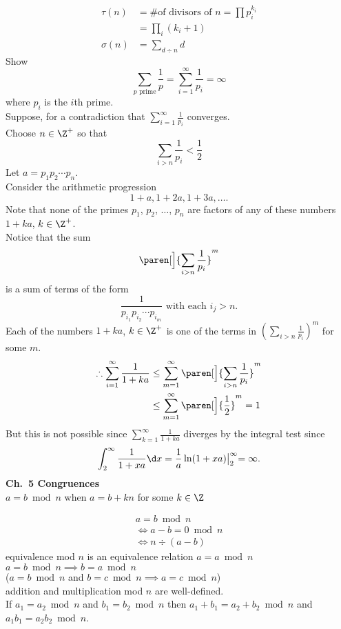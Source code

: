 \vspace{-\baselineskip}
\begin{align*}
\tau(n) &= \text{\# of divisors of $n=\prod p_i^{k_i}$} \\
&= \prod_i(k_i+1) \\
\sigma(n) &= \sum_{d\div n}d
\end{align*}
\eg Show
\[ \sum_{\text{$p$ prime}}\frac{1}{p} = \sum_{i=1}^\infty \frac{1}{p_i} = \infty \]
where $p_i$ is the $i$th prime. \\
\soln Suppose, for a contradiction that $\sum_{i=1}^\infty\frac1{p_i}$ converges. \\
Choose $n\in\Z^+$ so that
\[ \sum_{i>n}\frac1{p_i} < \frac12 \]
Let $a=p_1p_2\dotsm p_n$. \\
Consider the arithmetic progression
\[ 1+a, 1+2a, 1+3a, \dotsc . \]
Note that none of the primes $p_1$, $p_2$, $\dotsc$, $p_n$ are factors of any of these numbers $1+ka$, $k\in\Z^+$. \\
Notice that the sum
\[ \paren[\Big]{\sum_{i>n}\frac{1}{p_i}}^m \]
is a sum of terms of the form
\[ \frac{1}{p_{i_1}p_{i_2}\dotsm p_{i_m}} \text{ with each $i_j>n$} . \]
Each of the numbers $1+ka$, $k\in\Z^+$ is one of the terms in $(\sum_{i>n}\frac{1}{p_i})^m$ for some $m$.
\begin{align*}
\therefore \sum_{i=1}^\infty \frac{1}{1+ka} &\leq \sum_{m=1}^\infty\paren[\Big]{\sum_{i>n}\frac{1}{p_i}}^m \\
&\leq \sum_{m=1}^\infty\paren[\Big]{\frac12}^m = 1
\end{align*}
But this is not possible since $\sum_{k=1}^\infty\frac{1}{1+ka}$ diverges by the integral test since
\[ \int_2^\infty\frac{1}{1+xa}\d x = \frac{1}{a}\ln(1+xa)\bigl|_2^\infty = \infty . \]
\textbf{Ch.~5 Congruences} \\
 $a=b\bmod n$ when $a=b+kn$ for some $k\in\Z$

\basicfacts
\begin{gather*}
a=b\bmod n \\
\iff a-b = 0\bmod n \\
\iff n\div(a-b)
\end{gather*}
equivalence mod $n$ is an equivalence relation
$a = a \bmod n$ \\
$a=b\bmod n\implies b=a\bmod n$ \\
($a=b\bmod n$ and $b=c\bmod n\implies a=c\bmod n$) \\
addition and multiplication mod $n$ are well-defined. \\
If $a_1=a_2\bmod n$ and $b_1=b_2\bmod n$ then $a_1+b_1=a_2+b_2\bmod n$ and $a_1b_1=a_2b_2\bmod n$.

